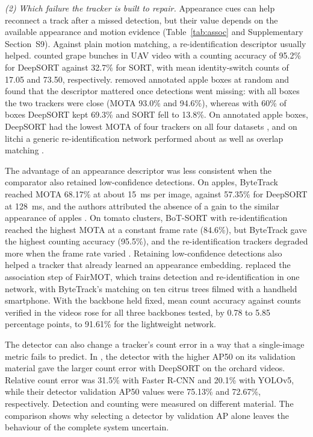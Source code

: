 \textit{(2) Which failure the tracker is built to repair.} Appearance cues can help reconnect a track after a missed detection, but their value depends on the available appearance and motion evidence (Table~\ref{tab:assoc} and Supplementary Section~S9). Against plain motion matching, a re-identification descriptor usually helped. \citet{piazolo2026enhanced} counted grape bunches in UAV video with a counting accuracy of 95.2\% for DeepSORT against 32.7\% for SORT, with mean identity-switch counts of 17.05 and 73.50, respectively. \citet{villacres2023apple} removed annotated apple boxes at random and found that the descriptor mattered once detections went missing: with all boxes the two trackers were close (MOTA 93.0\% and 94.6\%), whereas with 60\% of boxes DeepSORT kept 69.3\% and SORT fell to 13.8\%. On annotated apple boxes, DeepSORT had the lowest MOTA of four trackers on all four datasets \citep{matos2024tracking}, and on litchi a generic re-identification network performed about as well as overlap matching \citep{lu2025iot}.

The advantage of an appearance descriptor was less consistent when the comparator also retained low-confidence detections. On apples, ByteTrack reached MOTA 68.17\% at about 15~ms per image, against 57.35\% for DeepSORT at 128~ms, and the authors attributed the absence of a gain to the similar appearance of apples \citep{genemola2023video}. On tomato clusters, BoT-SORT with re-identification reached the highest MOTA at a constant frame rate (84.6\%), but ByteTrack gave the highest counting accuracy (95.5\%), and the re-identification trackers degraded more when the frame rate varied \citep{qi2025assessment}. Retaining low-confidence detections also helped a tracker that already learned an appearance embedding. \citet{xia2023lightweight} replaced the association step of FairMOT, which trains detection and re-identification in one network, with ByteTrack's matching on ten citrus trees filmed with a handheld smartphone. With the backbone held fixed, mean count accuracy against counts verified in the videos rose for all three backbones tested, by 0.78 to 5.85 percentage points, to 91.61\% for the lightweight network.

The detector can also change a tracker's count error in a way that a single-image metric fails to predict. In \citet{villacres2023apple}, the detector with the higher AP50 on its validation material gave the larger count error with DeepSORT on the orchard videos. Relative count error was 31.5\% with Faster R-CNN and 20.1\% with YOLOv5, while their detector validation AP50 values were 75.13\% and 72.67\%, respectively. Detection and counting were measured on different material. The comparison shows why selecting a detector by validation AP alone leaves the behaviour of the complete system uncertain.

